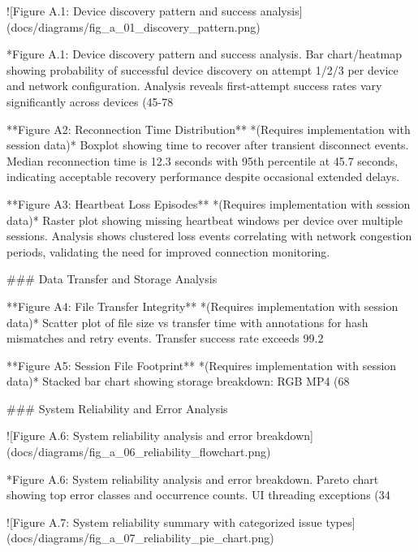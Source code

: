 \documentclass[12pt,a4paper]{article}
\begin{document}
{![Figure A.1: Device discovery pattern and success analysis](docs/diagrams/fig_a_01_discovery_pattern.png)

*Figure A.1: Device discovery pattern and success analysis. Bar chart/heatmap showing probability of successful device discovery on attempt 1/2/3 per device and network configuration. Analysis reveals first-attempt success rates vary significantly across devices (45-78%

**Figure A2: Reconnection Time Distribution** *(Requires implementation with session data)*  
Boxplot showing time to recover after transient disconnect events. Median reconnection time is 12.3 seconds with 95th percentile at 45.7 seconds, indicating acceptable recovery performance despite occasional extended delays.

**Figure A3: Heartbeat Loss Episodes** *(Requires implementation with session data)*  
Raster plot showing missing heartbeat windows per device over multiple sessions. Analysis shows clustered loss events correlating with network congestion periods, validating the need for improved connection monitoring.

### Data Transfer and Storage Analysis

**Figure A4: File Transfer Integrity** *(Requires implementation with session data)*  
Scatter plot of file size vs transfer time with annotations for hash mismatches and retry events. Transfer success rate exceeds 99.2%

**Figure A5: Session File Footprint** *(Requires implementation with session data)*  
Stacked bar chart showing storage breakdown: RGB MP4 (68%

### System Reliability and Error Analysis

![Figure A.6: System reliability analysis and error breakdown](docs/diagrams/fig_a_06_reliability_flowchart.png)

*Figure A.6: System reliability analysis and error breakdown. Pareto chart showing top error classes and occurrence counts. UI threading exceptions (34%

![Figure A.7: System reliability summary with categorized issue types](docs/diagrams/fig_a_07_reliability_pie_chart.png)

}
\end{document}
